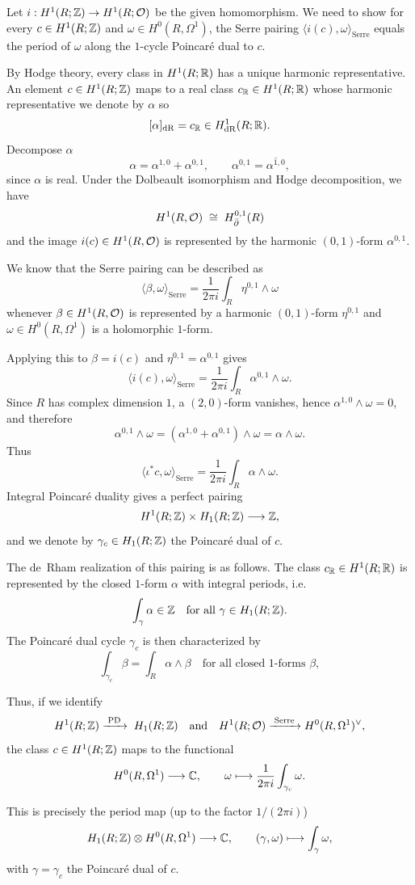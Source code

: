 \documentclass[12pt]{article}
\begin{document}
\begin{solution}
Let $i:H^1(R;\mathbb{Z})\to H^1(R;{\mathcal{O}})$ be the given homomorphism. We need to show
for every $c\in H^1(R;\mathbb{Z})$ and $\omega\in H^0(R,\Omega^1)$, the Serre
pairing
\(
\langle i(c),\omega\rangle_{\mathrm{Serre}}
\)
equals the period of $\omega$ along the $1$-cycle Poincar\'e dual to
$c$.

By Hodge theory, every class in $H^1(R;\mathbb{R})$ has a unique harmonic
representative.  An element $c\in H^1(R;\mathbb{Z})$ maps to a real class
$c_{\mathbb{R}}\in H^1(R;\mathbb{R})$ whose harmonic representative we denote by
$\alpha$ so
\[
[\alpha]_{\operatorname{dR}} = c_{\mathbb{R}}\in H^1_{\operatorname{dR}}(R;\mathbb{R}).
\]
Decompose $\alpha$
\[
\alpha = \alpha^{1,0}+\alpha^{0,1},
\qquad
\alpha^{0,1} = \overline{\alpha^{1,0}},
\]
since $\alpha$ is real.  Under the Dolbeault isomorphism and Hodge
decomposition, we have
\[
H^1(R,{\mathcal{O}})\;\cong\; H^{0,1}_{\bar\partial}(R)
\]
and the image $i(c)\in H^1(R,{\mathcal{O}})$ is represented by the harmonic $(0,1)$-form $\alpha^{0,1}$.

We know that the Serre pairing can be described as
\[
\langle\beta,\omega\rangle_{\mathrm{Serre}
}
=\frac{1}{2\pi i}\int_R \eta^{0,1}\wedge\omega
\]
whenever $\beta\in H^1(R,{\mathcal{O}})$ is represented by a harmonic
$(0,1)$-form $\eta^{0,1}$ and $\omega\in H^0(R,\Omega^1)$ is a
holomorphic $1$-form.

Applying this to $\beta=i(c)$ and $\eta^{0,1}=\alpha^{0,1}$ gives
\[
\langle i(c),\omega\rangle_{\mathrm{Serre}}
= \frac{1}{2\pi i}\int_R \alpha^{0,1}\wedge\omega.
\]
Since $R$ has complex dimension $1$, a $(2,0)$-form vanishes, hence
$\alpha^{1,0}\wedge\omega=0$, and therefore
\[
\alpha^{0,1}\wedge\omega
= (\alpha^{1,0}+\alpha^{0,1})\wedge\omega
= \alpha\wedge\omega.
\]
Thus
\begin{equation}
\label{eq:Serre-alpha}
\langle\iota^*c,\omega\rangle_{\mathrm{Serre}}
= \frac{1}{2\pi i}\int_R \alpha\wedge\omega.
\end{equation}
Integral Poincar\'e duality gives a perfect pairing
\[
H^1(R;\mathbb{Z})\times H_1(R;\mathbb{Z})\longrightarrow\mathbb{Z},
\]
and we denote by $\gamma_c\in H_1(R;\mathbb{Z})$ the Poincar\'e dual of $c$.

The de~Rham realization of this pairing is as follows.  The class
$c_{\mathbb{R}}\in H^1(R;\mathbb{R})$ is represented by the closed $1$-form $\alpha$ with integral periods, i.e.
\[
\int_\gamma \alpha \in \mathbb{Z}
\quad\text{for all } \gamma\in H_1(R;\mathbb{Z}).
\]
The Poincar\'e dual cycle $\gamma_c$ is then characterized by
\[
\int_{\gamma_c} \beta
= \int_R \alpha\wedge\beta
\quad\text{for all closed $1$-forms }\beta,
\]

Thus, if we identify
\[
H^1(R;\mathbb{Z})\xrightarrow{\;\text{PD}\;}\; H_1(R;\mathbb{Z})
\quad\text{and}\quad
H^1(R;{\mathcal{O}})\xrightarrow{\;\text{Serre}\;}
H^0(R,\Omega^1)^\vee,
\]
the class $c\in H^1(R;\mathbb{Z})$ maps to the functional
\[
H^0(R,\Omega^1)\longrightarrow\mathbb{C},
\qquad
\omega\longmapsto \frac{1}{2\pi i}\int_{\gamma_c}\omega.
\]

This is precisely the period map (up to the factor $1/(2\pi i)$)
\[
H_1(R;\mathbb{Z})\otimes H^0(R,\Omega^1)\longrightarrow\mathbb{C},
\qquad
(\gamma,\omega)\longmapsto\int_\gamma\omega,
\]
with $\gamma=\gamma_c$ the Poincar\'e dual of $c$.
\end{solution}
\end{document}
